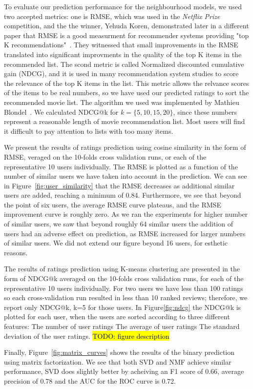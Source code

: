 To evaluate our prediction performance for the neighbourhood models, we used two accepted metrics: one is RMSE, which was used in the \textit{Netflix Prize} competition, and the the winner, Yehuda Koren, demonstrated later in a different paper that RMSE is a good measurment for recommender systems providing "top K recommendations"~\cite{koren2008factorization}. They witnessed that small improvements in the RMSE translated into significant improvments in the quality of the top K items in the recommended list. The scond metric is called Normalized discounted cumulative gain (NDCG), and it is used in many recommendation system studies to score the relevance of the top K items in the list. This metric allows the relvance scores of the items to be real numbers, so we have used our predicted ratings to sort the recommended movie list. The algorithm we used was implemented by Mathieu Blondel~\cite{letorMetrics}. We calculated NDCG@k for $k=\{5, 10, 15, 20\}$, since these numbers represent a reasonable length of movie recommendation list. Most users will find it difficult to pay attention to lists with too many items. 

We present the results of ratings prediction using cosine similarity in the form of RMSE, veraged on the 10-folds cross validation runs, or each of the representative 10 users individually. 
The RMSE is plotted as a function of the number of similar users we have taken into account in the prediction. 
We can see in Figure~\ref{fig:user_similarity} that the RMSE decreases as additional similar users are added, reaching a minimum of 0.84.
Furthermore, we see that beyond the point of six users, the average RMSE curve plateaus, and the RMSE improvement curve is roughly zero.
As we ran the experiments for higher number of similar users, we saw that beyond roughly 64 similar users the addition of users had an adverse effect on prediction, as RMSE increased for larger numbers of similar users.
We did not extend our figure beyond 16 users, for esthetic reasons. 

The results of ratings prediction using K-means clustering are presented in the form of NDCG@k averaged on the 10-folds cross validation runs, for each of the representative 10 users individually. For two users we have less than 100 ratings so each cross-validation run resulted in less than 10 ranked reviews; therefore, we report only NDCG@k, k=5 for those users. In Figure\ref{fig:ndcg} the NDCG@k is plotted for each user, when the users are sorted according to three different features: \blackone The number of user ratings \blacktwo The average of user ratings \blackthree The standard deviation of the user ratings. \hl{TODO: figure description}

Finally, Figure~\ref{fig:matrix_curves} shows the results of the binary prediction using matrix factorization. 
We see that both SVD and NMF achieve similar performance, SVD does slightly better by acheiving an F1 score of 0.66, average precision of 0.78 and the AUC for the ROC curve is 0.72.
